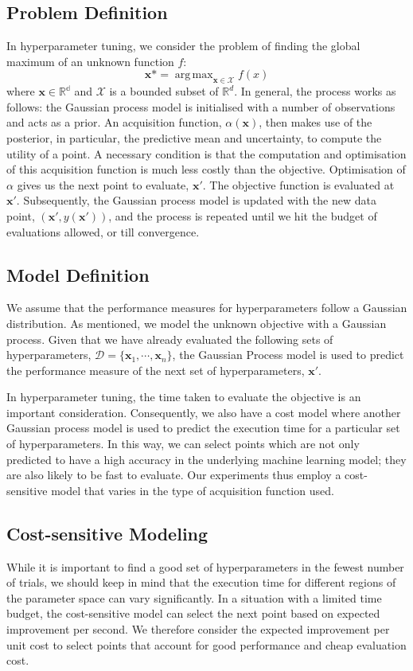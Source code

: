\documentclass[letterpaper]{article}
\DeclareMathOperator*{\argmax}{arg\,max}
\begin{document}
\subsection{Problem Definition}
In hyperparameter tuning, we consider the problem of finding the global maximum of
an unknown function $f$:
$$\textbf{x*}=\argmax_{\textbf{x}\in\mathcal{X}}{f(x)}$$
where $\textbf{x} \in \mathbb{R^d}$ and $\mathcal{X}$ is a bounded subset of
$\mathbb{R}^d$. In general, the process works as follows: the Gaussian process model
is initialised with a number of observations and acts as a prior.
An acquisition function, $\alpha(\textbf{x})$, then makes use
of the posterior, in particular, the predictive mean and uncertainty,
to compute the utility of a point. A necessary condition is that the computation and
optimisation of this acquisition function is much less costly than the objective.
Optimisation of $\alpha$ gives us the next point to evaluate, $\textbf{x}'$. The
objective function is evaluated at $\textbf{x}'$. Subsequently, the Gaussian process
model is updated with the new data point, $(\textbf{x}', y(\textbf{x}'))$, and the
process is repeated until we hit the budget of evaluations allowed, or till
convergence.

\subsection{Model Definition}
We assume that the performance measures for hyperparameters follow a
Gaussian distribution. As mentioned, we model the unknown objective with a Gaussian process.
Given that we have already evaluated the following sets of hyperparameters,
$\mathcal{D}=\{\textbf{x}_1, \cdots, \textbf{x}_n\}$, the Gaussian
Process model is used to predict the performance measure of the next set of hyperparameters,
$\textbf{x}'$.

In hyperparameter tuning, the time taken to evaluate the objective is
an important consideration. Consequently, we also have a cost model where
another Gaussian process model is used to predict the execution time for a particular
set of hyperparameters. In this way, we can select points which are not only
predicted to have a high accuracy in the underlying machine learning model; they
are also likely to be fast to evaluate. Our experiments thus employ
a cost-sensitive model that varies in the type of acquisition function used.

\subsection{Cost-sensitive Modeling}
While it is important to find a good set of hyperparameters in the fewest number of
trials, we should keep in mind that the execution time for different regions of the
parameter space can vary significantly. In a situation with a limited time budget,
the cost-sensitive model can select the next point based on expected
improvement per second. We therefore consider the expected improvement per unit cost
to select points that account for good performance and cheap evaluation cost.
\end{document}
